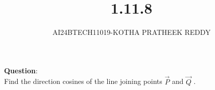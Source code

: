 \documentclass[journal]{IEEEtran}
\begin{document}

\vspace{3cm}

\title{1.11.8}
\author{AI24BTECH11019-KOTHA PRATHEEK REDDY}

 \maketitle
{\let\newpage\relax\maketitle}

\renewcommand{\thefigure}{\theenumi}
\renewcommand{\thetable}{\theenumi}
\setlength{\intextsep}{10pt} %


\renewcommand{\thetable}{\theenumi}
\textbf{Question}:\\
Find the direction cosines of the line joining points $\vec{P}$   and $\vec{Q}$ .\\
\end{document}
